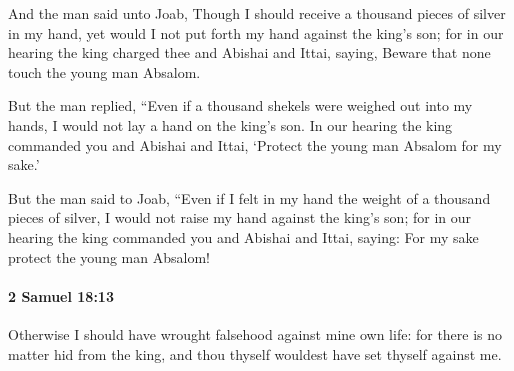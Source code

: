 			\begin{versebox}
					\item[BHS] 
					\item[ASV] And the man said unto Joab, Though I should receive a thousand pieces of silver in my hand, yet would I not put forth my hand against the king's son; for in our hearing the king charged thee and Abishai and Ittai, saying, Beware that none touch the young man Absalom.
					\item[NIV] But the man replied, “Even if a thousand shekels were weighed out into my hands, I would not lay a hand on the king’s son. In our hearing the king commanded you and Abishai and Ittai, ‘Protect the young man Absalom for my sake.’
					\item[NRSV] But the man said to Joab, “Even if I felt in my hand the weight of a thousand pieces of silver, I would not raise my hand against the king’s son; for in our hearing the king commanded you and Abishai and Ittai, saying: For my sake protect the young man Absalom!
			\end{versebox}

		\paragraph{2 Samuel 18:13} %
			\label{2SAMUEL-18-13}

			Otherwise I should have wrought falsehood against mine own life: for there is no matter hid from the king, and thou thyself wouldest have set thyself against me.

